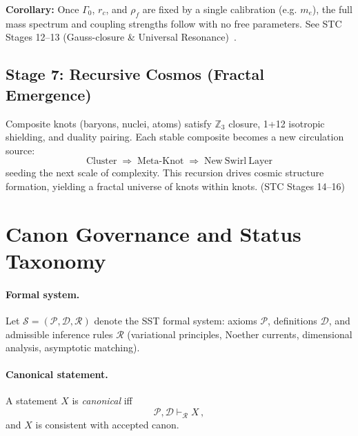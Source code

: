 \documentclass[10pt,reprint,aps,onecolumn,nofootinbib]{revtex4-2}
\begin{document}
\begin{tcolorbox}[title=Zero–Parameter Principle (Canonical),colframe=blue!75!black]
                \textbf{Corollary:}
                Once $\Gamma_0$, $r_c$, and $\rho_{\!f}$ are fixed by a single calibration
                (e.g. $m_e$), the full mass spectrum and coupling strengths follow with no free parameters.
                See STC Stages 12–13 (Gauss-closure \& Universal Resonance)~\cite{Goldau2025_STC}.
            \end{tcolorbox}

        \subsection*{Stage 7: Recursive Cosmos (Fractal Emergence)}
            Composite knots (baryons, nuclei, atoms) satisfy $\mathbb{Z}_3$ closure,
            1+12 isotropic shielding, and duality pairing.
            Each stable composite becomes a new circulation source:
            \[
                \mathrm{Cluster} \;\Rightarrow\;
                \mathrm{Meta\text{-}Knot} \;\Rightarrow\;
                \mathrm{New\ Swirl\ Layer}
            \]
            seeding the next scale of complexity.
            This recursion drives cosmic structure formation, yielding a fractal universe of knots within knots.
            \hfill (STC Stages 14–16)


    \section{Canon Governance and Status Taxonomy}\label{canon58:governance}
        \paragraph{Formal system.}
            Let $\mathcal{S}=(\mathcal{P},\mathcal{D},\mathcal{R})$ denote the SST formal system: axioms $\mathcal{P}$, definitions $\mathcal{D}$, and admissible inference rules $\mathcal{R}$ (variational principles, Noether currents, dimensional analysis, asymptotic matching).
        \paragraph{Canonical statement.}
            A statement $X$ is \emph{canonical} iff
            \[
                \mathcal{P},\mathcal{D}\vdash_{\mathcal{R}} X\,,
            \]
            and $X$ is consistent with accepted canon. %
\end{document}
